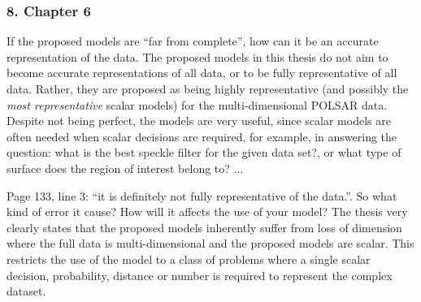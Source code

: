     
\subsubsection*{8. Chapter 6}

\replyToComment
    {If the proposed models are ``far from complete'', how can it be an accurate representation of the data.}
    {The proposed models in this thesis do not aim to become accurate representations of all data, or to be fully representative of all data.
Rather, they are proposed as being highly representative (and possibly the \textit{most representative} scalar models) for the multi-dimensional POLSAR data.
Despite not being perfect, the models are very useful, since scalar models are often needed when scalar decisions are required,
  for example, in answering the question: what is the best speckle filter for the given data set?, or what type of surface does the region of interest belong to? ...
}

\replyToComment
    {
      Page 133, line 3: ``it is definitely not fully representative of the data.''.
      So what kind of error it cause?
      How will it affects the use of your model?
    }
    {
      The thesis very clearly states %
       that the proposed models inherently suffer from loss of dimension where the full data is multi-dimensional and the proposed models are scalar.
      This restricts the use of the model to a class of problems where a single scalar decision, probability, distance or number is required to represent the complex dataset.
    }

